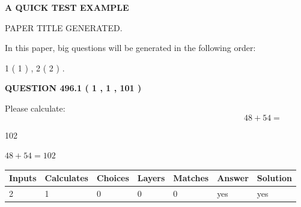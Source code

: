 \documentclass[12pt]{article}
\begin{document}
   
 \vspace{0.2in}
{\LARGE {\textbf{ A QUICK TEST EXAMPLE}}}
   
   
 PAPER TITLE GENERATED.
   
   
   
\vspace{0.2in}
   
In this paper, big questions will be generated in the following order: 
   
   
   1 ( 1 )
 ,
   2 ( 2 )
 .
  
\vspace{0.2in}
  
{\textbf{\Large{QUESTION
496.1 
 ( 1 , 1 , 101 )
}}}
  
  
 
Please calculate:
\begin{equation}
48 +  %
54 = \nonumber
\end{equation}
 
 
 
\noindent{}
 
 

102
 
 
\noindent{}
 
 

 
 
 
\noindent{}
 
 

$ %
48 +  %
54=   %
102$
 
 
\noindent{}
 
 

 
   
   
   
   
\noindent\begin{tabular}{|l|l|l|l|l|l|l|}
 \hline
Inputs & Calculates & Choices & Layers & Matches & Answer & Solution \\ \hline
 2  & 
 1  & 
 0
  & 
 0  & 
 0  & 
  yes & 
  yes 
  \\ \hline
 \end{tabular}
   
   
   
   
\noindent{}
   
\end{document}
